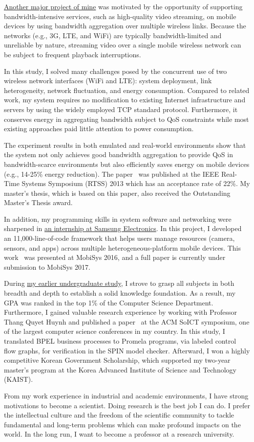 \ul{Another major project of mine} was motivated by the opportunity of supporting bandwidth-intensive services, such as high-quality video streaming, on mobile devices by using bandwidth aggregation over multiple wireless links.
Because the networks (e.g., 3G, LTE, and WiFi) are typically bandwidth-limited and unreliable by nature, streaming video over a single mobile wireless network can be subject to frequent playback interruptions.

In this study, I solved many challenges posed by the concurrent use of two wireless network interfaces (WiFi and LTE): system deployment, link heterogeneity, network fluctuation, and energy consumption.
Compared to related work, my system requires no modification to existing Internet infrastructure and servers by using the widely employed TCP standard protocol.
Furthermore, it conserves energy in aggregating bandwidth subject to QoS constraints while most existing approaches paid little attention to power consumption.

The experiment results in both emulated and real-world environments show that the system not only achieves good bandwidth aggregation to provide QoS in bandwidth-scarce environments but also efficiently saves energy on mobile devices (e.g., 14-25\% energy reduction).
The paper~\cite{greenbag} was published at the IEEE Real-Time Systems Symposium (RTSS) 2013 which has an acceptance rate of 22\%. My master's thesis, which is based on this paper, also received the Outstanding Master's Thesis award.

In addition, my programming skills in system software and networking were sharpened in \ul{an internship at Samsung Electronics}. In this project, I developed an 11,000-line-of-code framework that helps users manage resources (camera, sensors, and apps) across multiple heterogeneous-platform mobile devices.
This work~\cite{mobileplus} was presented at MobiSys 2016, and a full paper is currently under submission to MobiSys 2017.


During \ul{my earlier undergraduate study}, I strove to grasp all subjects in both breadth and depth to establish a solid knowledge foundation. As a result, my GPA was ranked in the top 1\% of the Computer Science Department.
Furthermore, I gained valuable research experience by working with Professor Thang Quyet Huynh and published a paper~\cite{bpelverify} at the ACM SoICT symposium, one of the largest computer science conferences in my country. In this study, I translated BPEL business processes to Promela programs, via labeled control flow graphs, for verification in the SPIN model checker. 
Afterward, I won a highly competitive Korean Government Scholarship, which supported my two-year master's program at the Korea Advanced Institute of Science and Technology (KAIST).

From my work experience in industrial and academic environments, I have strong motivations to become a scientist.
Doing research is the best job I can do.
I prefer the intellectual culture and the freedom of the scientific community to tackle fundamental and long-term problems which can make profound impacts on the world.
In the long run, I want to become a professor at a research university.
